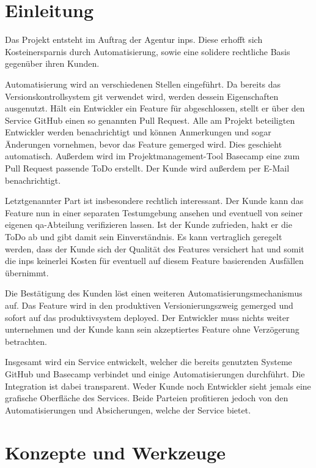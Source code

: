 \section{Einleitung} %
\label{sec:einleitung}

Das Projekt entsteht im Auftrag der Agentur \gls{inps}. Diese erhofft sich Kosteinersparnis durch Automatisierung, sowie eine solidere rechtliche Basis gegenüber ihren Kunden.

Automatisierung wird an verschiedenen Stellen eingeführt. Da bereits das Versionskontrollsystem git verwendet wird, werden dessein Eigenschaften ausgenutzt. Hält ein Entwickler ein Feature für abgeschlossen, stellt er über den Service GitHub einen so genannten Pull Request. Alle am Projekt beteiligten Entwickler werden benachrichtigt und können Anmerkungen und sogar Änderungen vornehmen, bevor das Feature gemerged wird. Dies geschieht automatisch. Außerdem wird im Projektmanagement-Tool Basecamp eine zum Pull Request passende ToDo erstellt. Der Kunde wird außerdem per E-Mail benachrichtigt.

Letztgenannter Part ist insbesondere rechtlich interessant. Der Kunde kann das Feature nun in einer separaten Testumgebung ansehen und eventuell von seiner eigenen \gls{qa}-Abteilung verifizieren lassen. Ist der Kunde zufrieden, hakt er die ToDo ab und gibt damit sein Einverständnis. Es kann vertraglich geregelt werden, dass der Kunde sich der Qualität des Features versichert hat und somit die \gls{inps} keinerlei Kosten für eventuell auf diesem Feature basierenden Ausfällen übernimmt.

Die Bestätigung des Kunden löst einen weiteren Automatisierungsmechanismus auf. Das Feature wird in den produktiven Versionierungszweig gemerged und sofort auf das \gls{produktivsystem} deployed. Der Entwickler muss nichts weiter unternehmen und der Kunde kann sein akzeptiertes Feature ohne Verzögerung betrachten.

Insgesamt wird ein Service entwickelt, welcher die bereits genutzten Systeme GitHub und Basecamp verbindet und einige Automatisierungen durchführt. Die Integration ist dabei transparent. Weder Kunde noch Entwickler sieht jemals eine grafische Oberfläche des Services. Beide Parteien profitieren jedoch von den Automatisierungen und Absicherungen, welche der Service bietet.


\section{Konzepte und Werkzeuge} %
\label{sec:konzepte_und_werkzeuge}

